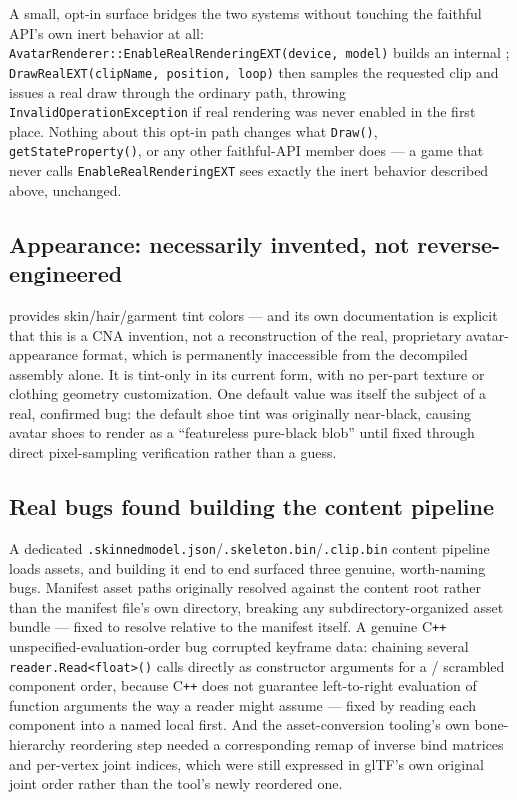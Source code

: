 A small, opt-in surface bridges the two systems without touching the faithful API's own
inert behavior at all: \texttt{AvatarRenderer::EnableRealRenderingEXT(device, model)} builds
an internal ; \texttt{DrawRealEXT(clipName, position, loop)} then
samples the requested clip and issues a real draw through the ordinary
 path, throwing \texttt{InvalidOperationException} if real rendering
was never enabled in the first place. Nothing about this opt-in path changes what
\texttt{Draw()}, \texttt{getStateProperty()}, or any other faithful-API member does --- a game
that never calls \texttt{EnableRealRenderingEXT} sees exactly the inert behavior described
above, unchanged.

\subsection{Appearance: necessarily invented, not reverse-engineered}

 provides skin/hair/garment tint colors --- and its own
documentation is explicit that this is a CNA invention, not a reconstruction of the real,
proprietary avatar-appearance format, which is permanently inaccessible from the decompiled
assembly alone. It is tint-only in its current form, with no per-part texture or clothing
geometry customization. One default value was itself the subject of a real, confirmed bug:
the default shoe tint was originally near-black, causing avatar shoes to render as a
``featureless pure-black blob'' until fixed through direct pixel-sampling verification rather
than a guess.

\subsection{Real bugs found building the content pipeline}

A dedicated \texttt{.skinnedmodel.json}/\texttt{.skeleton.bin}/\texttt{.clip.bin} content
pipeline loads  assets, and building it end to end surfaced three
genuine, worth-naming bugs. Manifest asset paths originally resolved against the content
root rather than the manifest file's own directory, breaking any subdirectory-organized asset
bundle --- fixed to resolve relative to the manifest itself. A genuine C\texttt{++}
unspecified-evaluation-order bug corrupted keyframe data: chaining several
\texttt{reader.Read<float>()} calls directly as constructor arguments for a
/ scrambled component order, because C\texttt{++} does
not guarantee left-to-right evaluation of function arguments the way a reader might assume ---
fixed by reading each component into a named local first. And the asset-conversion tooling's
own bone-hierarchy reordering step needed a corresponding remap of inverse bind matrices and
per-vertex joint indices, which were still expressed in glTF's own original joint order rather
than the tool's newly reordered one.

